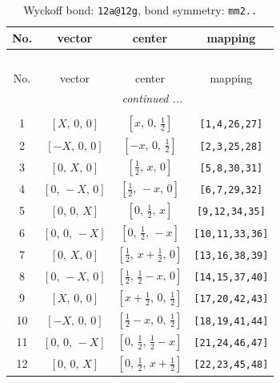 \documentclass[fleqn,8pt]{jsarticle}
\begin{document}
\renewcommand{\arraystretch}{1.2}
\begin{longtable}{cccc}
\caption{Wyckoff bond: {\tt 12a@12g}, bond symmetry: {\tt mm2..}}
 \\
 \hline \hline
No. & vector & center & mapping \\ \hline \endfirsthead

\multicolumn{3}{l}{\tablename\ \thetable{}} \\
 \hline \hline
No. & vector & center & mapping \\ \hline \endhead

 \hline \hline
\multicolumn{3}{r}{\footnotesize\it continued ...} \\ \endfoot

 \hline \hline
\multicolumn{3}{r}{} \\ \endlastfoot

1 & $\left[ X,\, 0,\, 0 \right]$ & $\left[ x,\, 0,\, \frac{1}{2} \right]$ & {\tt [1,4,26,27]} \\ \hline
2 & $\left[ - X,\, 0,\, 0 \right]$ & $\left[ - x,\, 0,\, \frac{1}{2} \right]$ & {\tt [2,3,25,28]} \\ \hline
3 & $\left[ 0,\, X,\, 0 \right]$ & $\left[ \frac{1}{2},\, x,\, 0 \right]$ & {\tt [5,8,30,31]} \\ \hline
4 & $\left[ 0,\, - X,\, 0 \right]$ & $\left[ \frac{1}{2},\, - x,\, 0 \right]$ & {\tt [6,7,29,32]} \\ \hline
5 & $\left[ 0,\, 0,\, X \right]$ & $\left[ 0,\, \frac{1}{2},\, x \right]$ & {\tt [9,12,34,35]} \\ \hline
6 & $\left[ 0,\, 0,\, - X \right]$ & $\left[ 0,\, \frac{1}{2},\, - x \right]$ & {\tt [10,11,33,36]} \\ \hline
7 & $\left[ 0,\, X,\, 0 \right]$ & $\left[ \frac{1}{2},\, x + \frac{1}{2},\, 0 \right]$ & {\tt [13,16,38,39]} \\ \hline
8 & $\left[ 0,\, - X,\, 0 \right]$ & $\left[ \frac{1}{2},\, \frac{1}{2} - x,\, 0 \right]$ & {\tt [14,15,37,40]} \\ \hline
9 & $\left[ X,\, 0,\, 0 \right]$ & $\left[ x + \frac{1}{2},\, 0,\, \frac{1}{2} \right]$ & {\tt [17,20,42,43]} \\ \hline
10 & $\left[ - X,\, 0,\, 0 \right]$ & $\left[ \frac{1}{2} - x,\, 0,\, \frac{1}{2} \right]$ & {\tt [18,19,41,44]} \\ \hline
11 & $\left[ 0,\, 0,\, - X \right]$ & $\left[ 0,\, \frac{1}{2},\, \frac{1}{2} - x \right]$ & {\tt [21,24,46,47]} \\ \hline
12 & $\left[ 0,\, 0,\, X \right]$ & $\left[ 0,\, \frac{1}{2},\, x + \frac{1}{2} \right]$ & {\tt [22,23,45,48]} \\
\end{longtable}
\end{document}
